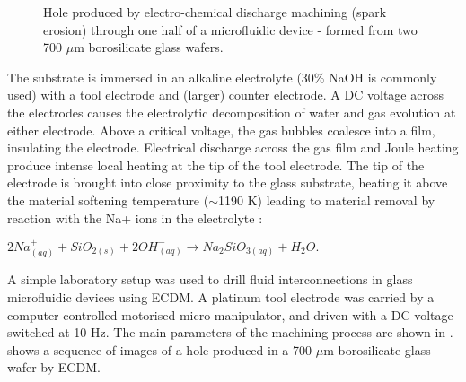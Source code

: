 \begin{figure}
\centering
{}
\caption[Hole through glass substrate produced by ECDM.]{Hole produced by electro-chemical discharge machining (spark erosion) through one half of a microfluidic device - formed from two 700 $\mu$m borosilicate glass wafers.}
\label{fig:ECDM_holes}
\end{figure}

The substrate is immersed in an alkaline electrolyte (30\% NaOH is commonly used) with a tool electrode and (larger) counter electrode. A DC voltage across the electrodes causes the electrolytic decomposition of water and gas evolution at either electrode. Above a critical voltage, the gas bubbles coalesce into a film, insulating the electrode. Electrical discharge across the gas film and Joule heating produce intense local heating at the tip of the tool electrode. The tip of the electrode is brought into close proximity to the glass substrate, heating it above the material softening temperature ($\sim$1190 K) leading to material removal by reaction with the Na+ ions in the electrolyte \citep{West:2007}:

\begin{center}
$2Na^{+}_{(aq)} + SiO_{2(s)} + 2OH^{-}_{(aq)} \xrightarrow{} Na_{2}SiO_{3(aq)} + H_{2}O.$
\end{center}

A simple laboratory setup was used to drill fluid interconnections in glass microfluidic devices using ECDM. A platinum tool electrode was carried by a computer-controlled motorised micro-manipulator, and driven with a DC voltage switched at 10 Hz. The main parameters of the machining process are shown in .  shows a sequence of images of a hole produced in a 700 $\mu$m borosilicate glass wafer by ECDM.
\\

